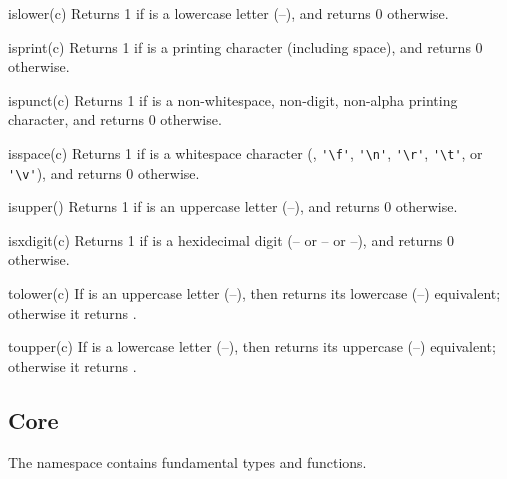 \begin{defun}{islower}{(c)}
Returns 1 if  is a lowercase letter (--),
and returns 0 otherwise.
\end{defun}

\begin{defun}{isprint}{(c)}
Returns 1 if  is a printing character (including space), and
returns 0 otherwise.
\end{defun}

\begin{defun}{ispunct}{(c)}
Returns 1 if  is a non-whitespace, non-digit, non-alpha
printing character, and returns 0 otherwise.
\end{defun}

\begin{defun}{isspace}{(c)}
Returns 1 if  is a whitespace character (,
\verb|'\f'|, \verb|'\n'|, \verb|'\r'|, \verb|'\t'|, or \verb|'\v'|),
and returns 0 otherwise.
\end{defun}

\begin{defun}{isupper}{()}
Returns 1 if  is an uppercase letter
(--), and returns 0 otherwise.
\end{defun}

\begin{defun}{isxdigit}{(c)}
Returns 1 if  is a hexidecimal digit (-- or
-- or --), and returns 0
otherwise.
\end{defun}

\begin{defun}{tolower}{(c)}
If  is an uppercase letter (--), then
 returns its lowercase (--)
equivalent; otherwise it returns .
\end{defun}

\begin{defun}{toupper}{(c)}
If  is a lowercase letter (--), then
 returns its uppercase
(--) equivalent; otherwise it returns .
\end{defun}

\subsection{Core}

The  namespace contains fundamental types and functions.

